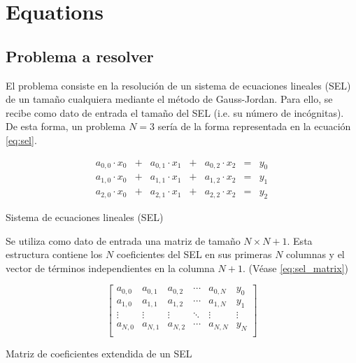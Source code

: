\pagestyle{fancy}
\fancyhead[LO]{\autorR}
\fancyhead[LE]{\autorA}
\fancyhead[RE,RO]{\textit{\rightmark}}
\fancyfoot[L]{\asignaturaAbbr}
\fancyfoot[R]{\fecha}

\section{Equations}
\label{sec:Equations}

\subsection{Problema a resolver}

El problema consiste en la resolución de un sistema de ecuaciones lineales
(SEL) de un tamaño cualquiera mediante el método de Gauss-Jordan.
Para ello, se recibe como dato de entrada el tamaño del SEL
(i.e. su número de incógnitas).
De esta forma, un problema $N=3$ sería de la forma representada en la
ecuación \ref{eq:sel}.

\begin{mycapequ}[h]
\begin{equation}
\begin{matrix}
    a_{0,0} \cdot x_0 & + & a_{0,1} \cdot x_1 & + & a_{0,2} \cdot x_2 & = & y_0 \\
    a_{1,0} \cdot x_0 & + & a_{1,1} \cdot x_1 & + & a_{1,2} \cdot x_2 & = & y_1 \\
    a_{2,0} \cdot x_0 & + & a_{2,1} \cdot x_1 & + & a_{2,2} \cdot x_2 & = & y_2
\end{matrix}
\end{equation}
\caption{Sistema de ecuaciones lineales (SEL)}
\label{eq:sel}
\end{mycapequ}

Se utiliza como dato de entrada una matriz de tamaño $N \times N+1$.
Esta estructura contiene los $N$ coeficientes del SEL en sus primeras $N$
columnas y el vector de términos independientes en la columna $N+1$.
(Véase \ref{eq:sel_matrix})

\begin{mycapequ}[h]
\begin{equation}
    \begin{bmatrix}
        a_{0,0} & a_{0,1} & a_{0,2} & \cdots & a_{0,N} & y_0 \\
        a_{1,0} & a_{1,1} & a_{1,2} & \cdots & a_{1,N} & y_1 \\
        \vdots & \vdots & \vdots & \ddots & \vdots & \vdots \\
        a_{N,0} & a_{N,1} & a_{N,2} & \cdots & a_{N,N} & y_N \\
    \end{bmatrix}
\end{equation}
\caption{Matriz de coeficientes extendida de un SEL}
\label{eq:sel_matrix}
\end{mycapequ}


